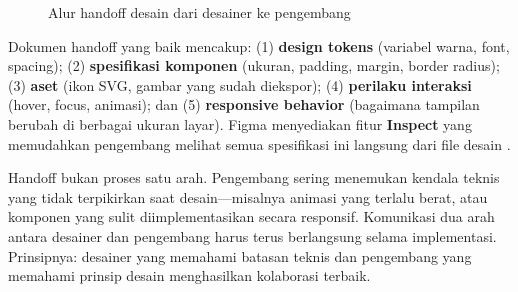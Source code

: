 \begin{figure}[htbp]
\centering
{}
\caption{Alur handoff desain dari desainer ke pengembang}
\end{figure}

Dokumen handoff yang baik mencakup: (1) \textbf{design tokens} (variabel warna, font, spacing); (2) \textbf{spesifikasi komponen} (ukuran, padding, margin, border radius); (3) \textbf{aset} (ikon SVG, gambar yang sudah diekspor); (4) \textbf{perilaku interaksi} (hover, focus, animasi); dan (5) \textbf{responsive behavior} (bagaimana tampilan berubah di berbagai ukuran layar). Figma menyediakan fitur \textbf{Inspect} yang memudahkan pengembang melihat semua spesifikasi ini langsung dari file desain \cite{figmaDocs}.

\begin{catatan}
Handoff bukan proses satu arah. Pengembang sering menemukan kendala teknis yang tidak terpikirkan saat desain---misalnya animasi yang terlalu berat, atau komponen yang sulit diimplementasikan secara responsif. Komunikasi dua arah antara desainer dan pengembang harus terus berlangsung selama implementasi. Prinsipnya: desainer yang memahami batasan teknis dan pengembang yang memahami prinsip desain menghasilkan kolaborasi terbaik.
\end{catatan}
